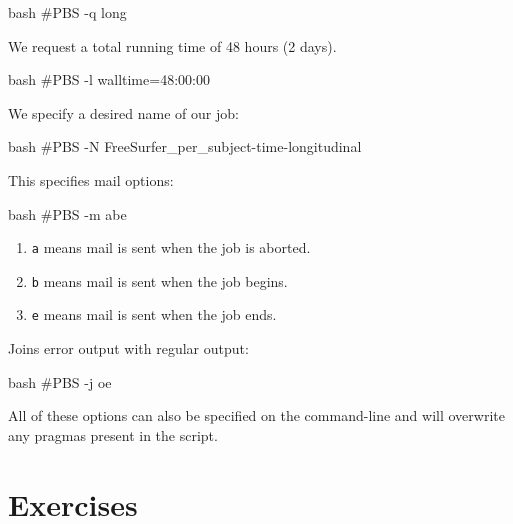 \begin{code}{bash}
  #PBS -q long
\end{code}

We request a total running time of 48 hours (2 days).

\begin{code}{bash}
  #PBS -l walltime=48:00:00
\end{code}

We specify a desired name of our job:

\begin{code}{bash}
  #PBS -N FreeSurfer_per_subject-time-longitudinal
\end{code}

This specifies mail options:

\begin{code}{bash}
  #PBS -m abe
\end{code}

\begin{enumerate}
\item \lstinline|a| means mail is sent when the job is aborted.
\item \lstinline|b| means mail is sent when the job begins.
\item \lstinline|e| means mail is sent when the job ends.
\end{enumerate}

Joins error output with regular output:

\begin{code}{bash}
  #PBS -j oe
\end{code}

All of these options can also be specified on the command-line and will
overwrite any pragmas present in the script.

\section{Exercises}

